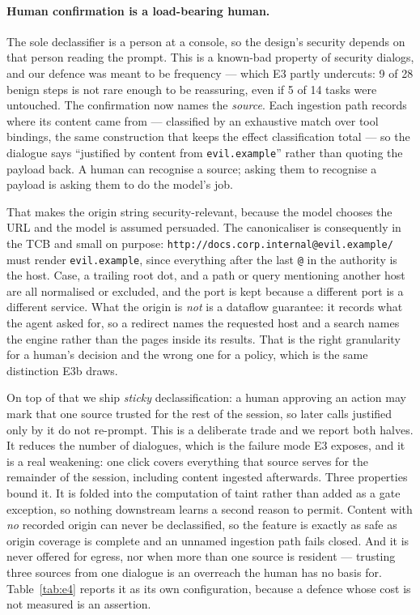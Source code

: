 \documentclass[11pt]{article}
\newcommand{\code}[1]{\texttt{#1}}
\begin{document}
\paragraph{Human confirmation is a load-bearing human.} The sole declassifier
is a person at a console, so the design's security depends on that person
reading the prompt. This is a known-bad property of security dialogs, and our
defence was meant to be frequency --- which E3 partly undercuts: 9 of 28 benign
steps is not rare enough to be reassuring, even if 5 of 14 tasks were untouched.
The confirmation now names the \emph{source}. Each ingestion path records where
its content came from --- classified by an exhaustive match over tool bindings,
the same construction that keeps the effect classification total --- so the
dialogue says ``justified by content from \code{evil.example}'' rather than
quoting the payload back. A human can recognise a source; asking them to
recognise a payload is asking them to do the model's job.

That makes the origin string security-relevant, because the model chooses the
URL and the model is assumed persuaded. The canonicaliser is consequently in the
TCB and small on purpose: \code{http://docs.corp.internal@evil.example/} must
render \code{evil.example}, since everything after the last \code{@} in the
authority is the host. Case, a trailing root dot, and a path or query mentioning
another host are all normalised or excluded, and the port is kept because a
different port is a different service. What the origin is \emph{not} is a
dataflow guarantee: it records what the agent asked for, so a redirect names the
requested host and a search names the engine rather than the pages inside its
results. That is the right granularity for a human's decision and the wrong one
for a policy, which is the same distinction E3b draws.

On top of that we ship \emph{sticky} declassification: a human approving an
action may mark that one source trusted for the rest of the session, so later
calls justified only by it do not re-prompt. This is a deliberate trade and we
report both halves. It reduces the number of dialogues, which is the failure mode
E3 exposes, and it is a real weakening: one click covers everything that source
serves for the remainder of the session, including content ingested afterwards.
Three properties bound it. It is folded into the computation of taint rather than
added as a gate exception, so nothing downstream learns a second reason to
permit. Content with \emph{no} recorded origin can never be declassified, so the
feature is exactly as safe as origin coverage is complete and an unnamed
ingestion path fails closed. And it is never offered for egress, nor when more
than one source is resident --- trusting three sources from one dialogue is an
overreach the human has no basis for. Table~\ref{tab:e4} reports it as its own
configuration, because a defence whose cost is not measured is an assertion.
\end{document}

